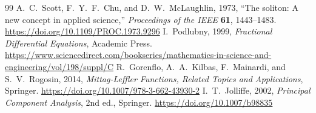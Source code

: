 \begin{thebibliography}{99}
 A.~C.~Scott, F.~Y.~F.~Chu, and D.~W.~McLaughlin, 1973, ``The soliton: A new concept in applied science,'' \emph{Proceedings of the IEEE} \textbf{61}, 1443--1483. \url{https://doi.org/10.1109/PROC.1973.9296}
 I.~Podlubny, 1999, \emph{Fractional Differential Equations}, Academic Press. \url{https://www.sciencedirect.com/bookseries/mathematics-in-science-and-engineering/vol/198/suppl/C}
 R.~Gorenflo, A.~A.~Kilbas, F.~Mainardi, and S.~V.~Rogosin, 2014, \emph{Mittag-Leffler Functions, Related Topics and Applications}, Springer. \url{https://doi.org/10.1007/978-3-662-43930-2}
 I.~T.~Jolliffe, 2002, \emph{Principal Component Analysis}, 2nd ed., Springer. \url{https://doi.org/10.1007/b98835}
\end{thebibliography}
